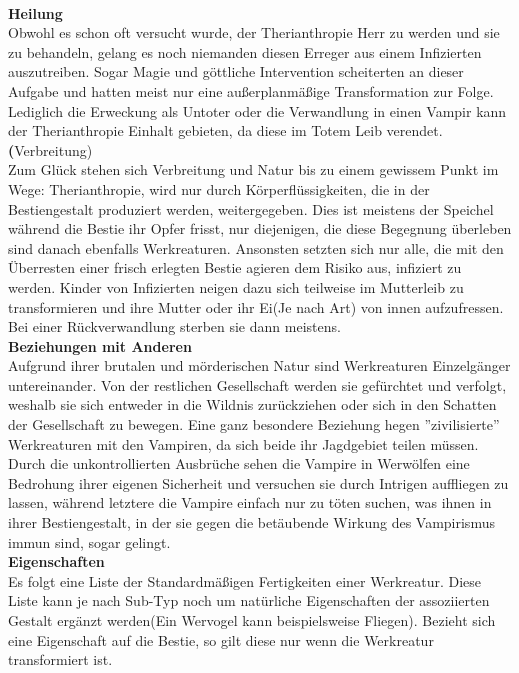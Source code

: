 \documentclass[a4paper,12pt,oneside]{book}
\begin{document}
\begin{description}
\\\textbf{Heilung}
\\Obwohl es schon oft versucht wurde, der Therianthropie Herr zu werden und sie zu behandeln, gelang es noch niemanden diesen Erreger aus einem Infizierten auszutreiben. Sogar Magie und göttliche Intervention scheiterten an dieser Aufgabe und hatten meist nur eine außerplanmäßige Transformation zur Folge.
Lediglich die Erweckung als Untoter oder die Verwandlung in einen Vampir kann der Therianthropie Einhalt gebieten, da diese im Totem Leib verendet.
\\\textbf(Verbreitung)
\\Zum Glück stehen sich Verbreitung und Natur bis zu einem gewissem Punkt im Wege: Therianthropie, wird nur durch Körperflüssigkeiten, die in der Bestiengestalt produziert werden, weitergegeben. Dies ist meistens der Speichel während die Bestie ihr Opfer frisst, nur diejenigen, die diese Begegnung überleben sind danach ebenfalls Werkreaturen. Ansonsten setzten sich nur alle, die mit den Überresten einer frisch erlegten Bestie agieren dem Risiko aus, infiziert zu werden. Kinder von Infizierten neigen dazu sich teilweise im Mutterleib zu transformieren und ihre Mutter oder ihr Ei(Je nach Art) von innen aufzufressen. Bei einer Rückverwandlung sterben sie dann meistens.
\\\textbf{Beziehungen mit Anderen}
\\Aufgrund ihrer brutalen und mörderischen Natur sind Werkreaturen Einzelgänger untereinander. Von der restlichen Gesellschaft werden sie gefürchtet und verfolgt, weshalb sie sich entweder in die Wildnis zurückziehen oder sich in den Schatten der Gesellschaft zu bewegen. Eine ganz besondere Beziehung hegen ''zivilisierte'' Werkreaturen mit den Vampiren, da sich beide ihr Jagdgebiet teilen müssen. Durch die unkontrollierten Ausbrüche sehen die Vampire in Werwölfen eine Bedrohung ihrer eigenen Sicherheit und versuchen sie durch Intrigen auffliegen zu lassen, während letztere die Vampire einfach nur zu töten suchen, was ihnen in ihrer Bestiengestalt, in der sie gegen die betäubende Wirkung des Vampirismus immun sind, sogar gelingt. 
\\\textbf{Eigenschaften}
\\Es folgt eine Liste der Standardmäßigen Fertigkeiten einer Werkreatur. Diese Liste kann je nach Sub-Typ noch um natürliche Eigenschaften der assoziierten Gestalt ergänzt werden(Ein Wervogel kann beispielsweise Fliegen). Bezieht sich eine Eigenschaft auf die Bestie, so gilt diese nur wenn die Werkreatur transformiert ist.

\end{description}
\end{document}
